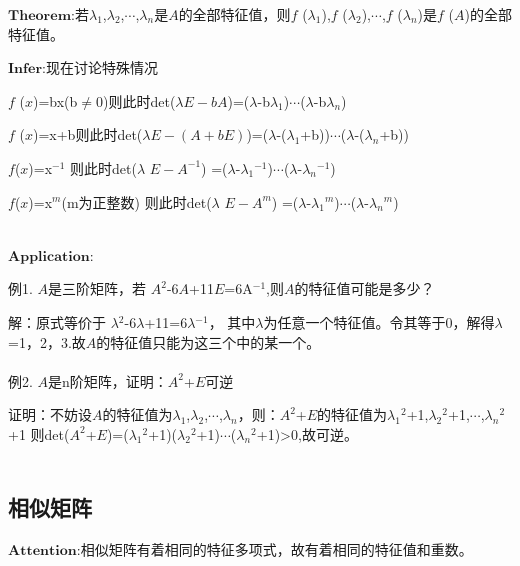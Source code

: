 \documentclass[a4paper,12pt]{book}
\begin{document}
$\mathbf{Theorem}$:若$\lambda$$_{1}$,$\lambda$$_{2}$,$\cdots$,$\lambda$$_{n}$是$\mathit{A}$的全部特征值，则$\mathit{f}$ ($\lambda$$_{1}$),$\mathit{f}$ ($\lambda$$_{2}$),$\cdots$,$\mathit{f}$ ($\lambda$$_{n}$)是$\mathit{f}$ ($\mathit{A}$)的全部特征值。

$\mathbf{Infer}$:现在讨论特殊情况

$\mathit{f}$ ($\mathit{x}$)=bx(b$\ne $0)则此时det($\lambda$$\mathit{E-bA}$)=($\lambda$-b$\lambda$$_{1}$)$\cdots$($\lambda$-b$\lambda$$_{n}$)

$\mathit{f}$ ($\mathit{x}$)=x+b则此时det($\lambda$$\mathit{E-(A+bE)}$)=($\lambda$-($\lambda$$_{1}$+b))$\cdots$($\lambda$-($\lambda$$_{n}$+b))

$\mathit{f}$($\mathit{x}$)=x$^{-1}$
则此时det($\lambda$ $\mathit{E-A^{-1}}$)
=($\lambda$-$\lambda$$_{1}$$^{-1}$)$\cdots$($\lambda$-$\lambda$$_{n}$$^{-1}$)

$\mathit{f}$($\mathit{x}$)=x$^{m}$(m为正整数)
则此时det($\lambda$ $\mathit{E-A^{m}}$)
=($\lambda$-$\lambda$$_{1}$$^{m}$)$\cdots$($\lambda$-$\lambda$$_{n}$$^{m}$)

~\\

$\mathbf{Application}$:

例1.  $\mathit{A}$是三阶矩阵，若
$\mathit{A}^{2}$-6$\mathit{A}$+11$\mathit{E}$=6A$^{-1} $,则$\mathit{A}$的特征值可能是多少？

解：原式等价于 $\lambda$$^{2}$-6$\lambda$+11=6$\lambda$$^{-1} $，
其中$\lambda$为任意一个特征值。令其等于0，解得$\lambda$=1，2，3.故$\mathit{A}$的特征值只能为这三个中的某一个。
~\\
~\\


例2.      $\mathit{A}$是n阶矩阵，证明：$\mathit{A}^{2}$+$\mathit{E}$可逆

证明：不妨设$\mathit{A}$的特征值为$\lambda$$_{1}$,$\lambda$$_{2}$,$\cdots$,$\lambda$$_{n}$，则：$\mathit{A}^{2}$+$\mathit{E}$的特征值为$\lambda$$_{1}$$^{2}$+1,$\lambda$$_{2}$$^{2}$+1,$\cdots$,$\lambda$$_{n}$$^{2}$+1
则det($\mathit{A}^{2}$+$\mathit{E}$)=($\lambda$$_{1}$$^{2}$+1)($\lambda$$_{2}$$^{2}$+1)$\cdots$($\lambda$$_{n}$$^{2}$+1)>0,故可逆。
~\\
~\\

\subsection{相似矩阵}
  $\mathbf{Attention}$:相似矩阵有着相同的特征多项式，故有着相同的特征值和重数。
  
\end{document}
